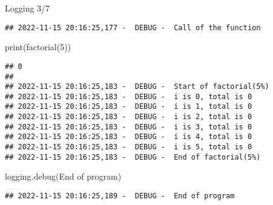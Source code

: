 \documentclass[
  8pt,
  ignorenonframetext,
]{beamer}
\newenvironment{Shaded}{\begin{snugshade}}{\end{snugshade}}
\newcommand{\BuiltInTok}[1]{#1}
\newcommand{\DecValTok}[1]{\textcolor[rgb]{0.00,0.00,0.81}{#1}}
\newcommand{\NormalTok}[1]{#1}
\newcommand{\StringTok}[1]{\textcolor[rgb]{0.31,0.60,0.02}{#1}}
\begin{document}
\begin{frame}[fragile]{Logging 3/7}
\begin{verbatim}
## 2022-11-15 20:16:25,177 -  DEBUG -  Call of the function
\end{verbatim}

\begin{Shaded}
\begin{Highlighting}[]
\BuiltInTok{print}\NormalTok{(factorial(}\DecValTok{5}\NormalTok{))}
\end{Highlighting}
\end{Shaded}

\begin{verbatim}
## 0
## 
## 2022-11-15 20:16:25,183 -  DEBUG -  Start of factorial(5%)
## 2022-11-15 20:16:25,183 -  DEBUG -  i is 0, total is 0
## 2022-11-15 20:16:25,183 -  DEBUG -  i is 1, total is 0
## 2022-11-15 20:16:25,183 -  DEBUG -  i is 2, total is 0
## 2022-11-15 20:16:25,183 -  DEBUG -  i is 3, total is 0
## 2022-11-15 20:16:25,183 -  DEBUG -  i is 4, total is 0
## 2022-11-15 20:16:25,183 -  DEBUG -  i is 5, total is 0
## 2022-11-15 20:16:25,183 -  DEBUG -  End of factorial(5%)
\end{verbatim}

\begin{Shaded}
\begin{Highlighting}[]
\NormalTok{logging.debug(}\StringTok{\textquotesingle{}End of program\textquotesingle{}}\NormalTok{)}
\end{Highlighting}
\end{Shaded}

\begin{verbatim}
## 2022-11-15 20:16:25,189 -  DEBUG -  End of program
\end{verbatim}
\end{frame}
\end{document}
